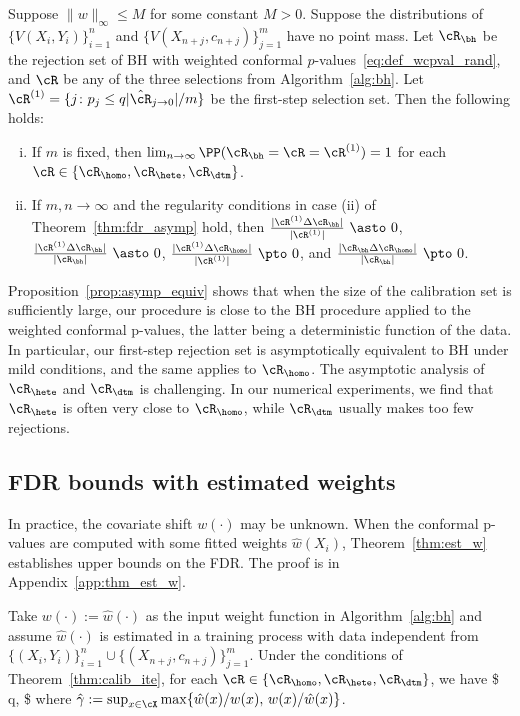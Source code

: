 \begin{prop}
\label{prop:asymp_equiv}
Suppose $\|w\|_\infty \leq M$ for some constant $M>0$.
Suppose the distributions of $\{V(X_i,Y_i)\}_{i=1}^n$
and $\{V(X_{n+j},c_{n+j} )\}_{j=1}^m$ have no point mass.
Let $\cR_{\bh}$ be the rejection set
of BH with weighted conformal $p$-values~\eqref{eq:def_wcpval_rand},
and $\cR$ be any of the three selections from Algorithm~\ref{alg:bh}. Let $\cR^{(1)}=\{j\colon  p_j\leq q|\hat\cR_{j\to 0}|/m\}$
be the first-step selection set.
Then the following holds:
\begin{enumerate}[(i)]
\item If $m$ is fixed, then $\lim_{n\to \infty}\PP(\cR_{\bh}= \cR = \cR^{(1)})=1$ for each $\cR \in \{\cR_{\homo},\cR_{\hete}, \cR_{\dtm}\}$.
\item If $m,n\to \infty$ and the regularity conditions in case (ii) of Theorem~\ref{thm:fdr_asymp}  hold,
then
 $\frac{|\cR^{(1)}\Delta \cR_{\bh}|}{|\cR^{(1)}|} ~\asto~0$,
 $\frac{|\cR^{(1)}\Delta \cR_{\bh}|}{|\cR_\bh|} ~\asto~0$,
$ \frac{|\cR^{(1)}\Delta \cR_{\homo}|}{|\cR^{(1)}|} ~\pto ~0$, and
$ \frac{|\cR_\bh\Delta \cR_{\homo}|}{|\cR_\bh|} ~\pto ~0$.
\end{enumerate}
\end{prop}

Proposition~\ref{prop:asymp_equiv}
shows that when the size of the calibration set
is sufficiently large,
our procedure is  close to the BH procedure applied to
the weighted conformal p-values, the latter being a deterministic function of the data.
In particular, our first-step rejection set is asymptotically equivalent to BH
under mild conditions, and the same applies to
$\cR_{\homo}$.
The asymptotic analysis of $\cR_{\hete}$ and $\cR_{\dtm}$ is
challenging.
In our numerical experiments, we find that $\cR_{\hete}$
is often very close to $\cR_{\homo}$,
while $\cR_{\dtm}$ usually makes too few rejections.


\subsection{FDR bounds with estimated weights}


In practice, the covariate shift $w(\cdot)$ may be unknown.
When the conformal p-values
are computed with some fitted weights $\hat{w}(X_i)$,
Theorem~\ref{thm:est_w} establishes upper bounds on the FDR.
The proof is in Appendix~\ref{app:thm_est_w}.

\begin{theorem}\label{thm:est_w}
Take $w(\cdot):=\hat{w}(\cdot)$
as the input weight function in Algorithm~\ref{alg:bh} and assume $\hat{w}(\cdot)$
is estimated in a training process with data independent from
$\{(X_i,Y_i)\}_{i=1}^{n}\cup\{(X_{n+j},c_{n+j})\}_{j=1}^m$.
Under the conditions of Theorem~\ref{thm:calib_ite}, for each $\cR \in \{\cR_{\homo},\cR_{\hete}, \cR_{\dtm}\}$, we have
\$
\fdr \leq  q\cdot \EE{},
\$
where $\hat\gamma := \sup_{x\in \cX} \max\{  \hat{w}(x)/w(x),\, w(x)/\hat{w}(x) \}$.
\end{theorem}

